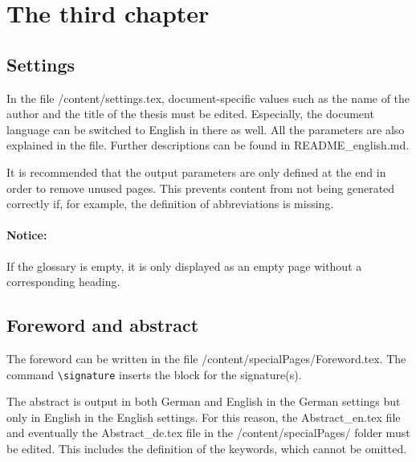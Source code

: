 \chapter{The third chapter}

\section{Settings}
In the file /content/settings.tex, document-specific values such as the name of the author and the title of the thesis must be edited. Especially, the document language can be switched to English in there as well. All the parameters are also explained in the file. Further descriptions can be found in README\_english.md.

It is recommended that the output parameters are only defined at the end in order to remove unused pages. This prevents content from not being generated correctly if, for example, the definition of abbreviations is missing.

\subsubsection{Notice:}
If the glossary is empty, it is only displayed as an empty page without a corresponding heading.


\section{Foreword and abstract}
The foreword can be written in the file /content/specialPages/Foreword.tex. The command \texttt{\textbackslash{}signature} inserts the block for the signature(s).

The abstract is output in both German and English in the German settings but only in English in the English settings. For this reason, the Abstract\_en.tex file and eventually the Abstract\_de.tex file in the /content/specialPages/ folder must be edited. This includes the definition of the keywords, which cannot be omitted.
